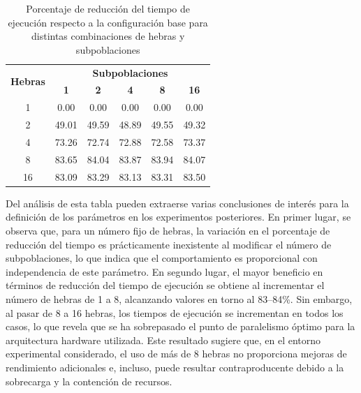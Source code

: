 \begin{table}[ht]
    \centering
    \begin{tabular}{|c|ccccc|}
        \hline
        \multirow{2}{*}{\textbf{Hebras}} & \multicolumn{5}{c|}{\textbf{Subpoblaciones}}                                                      \\ \cline{2-6}
                                         & \textbf{1}                                   & \textbf{2} & \textbf{4} & \textbf{8} & \textbf{16} \\ \hline
        1                                & 0.00                                         & 0.00       & 0.00       & 0.00       & 0.00        \\ \hline
        2                                & 49.01                                        & 49.59      & 48.89      & 49.55      & 49.32       \\ \hline
        4                                & 73.26                                        & 72.74      & 72.88      & 72.58      & 73.37       \\ \hline
        8                                & 83.65                                        & 84.04      & 83.87      & 83.94      & 84.07       \\ \hline
        16                               & 83.09                                        & 83.29      & 83.13      & 83.31      & 83.50       \\ \hline
    \end{tabular}
    \caption{Porcentaje de reducción del tiempo de ejecución respecto a la configuración base para distintas combinaciones de hebras y subpoblaciones}
    \label{tab:exploratory_populations_delta}
\end{table}

Del análisis de esta tabla pueden extraerse varias conclusiones de interés para la definición de los parámetros en los experimentos posteriores. En primer lugar, se observa que, para un número fijo de hebras, la variación en el porcentaje de reducción del tiempo es prácticamente inexistente al modificar el número de subpoblaciones, lo que indica que el comportamiento es proporcional con independencia de este parámetro. En segundo lugar, el mayor beneficio en términos de reducción del tiempo de ejecución se obtiene al incrementar el número de hebras de 1 a 8, alcanzando valores en torno al 83--84\%. Sin embargo, al pasar de 8 a 16 hebras, los tiempos de ejecución se incrementan en todos los casos, lo que revela que se ha sobrepasado el punto de paralelismo óptimo para la arquitectura hardware utilizada. Este resultado sugiere que, en el entorno experimental considerado, el uso de más de 8 hebras no proporciona mejoras de rendimiento adicionales e, incluso, puede resultar contraproducente debido a la sobrecarga y la contención de recursos.

